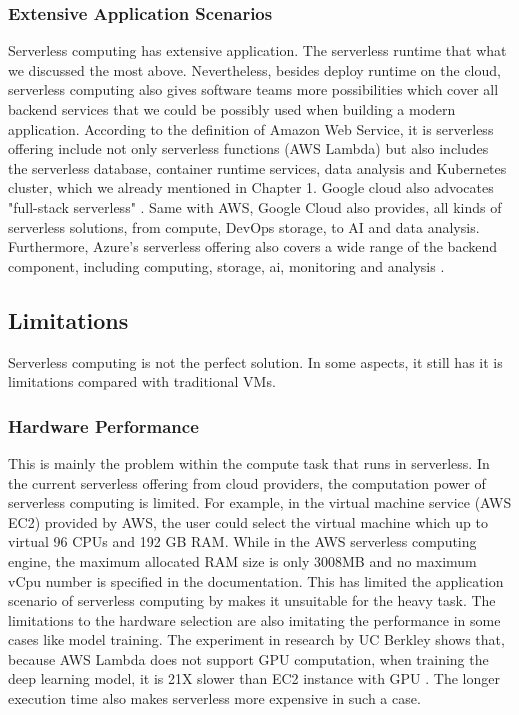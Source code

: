 \subsubsection{Extensive Application Scenarios}
Serverless computing has extensive application. The serverless runtime that what we discussed the most above. Nevertheless, besides deploy runtime on the cloud, serverless computing also gives software teams more possibilities which cover all backend services that we could be possibly used when building a modern application. According to the definition of Amazon Web Service, it is serverless offering include not only serverless functions (AWS Lambda) but also includes the serverless database, container runtime services, data analysis and Kubernetes cluster, which we already mentioned in Chapter 1. Google cloud also advocates "full-stack serverless" \cite{Serverle29:online}. Same with AWS, Google Cloud also provides, all kinds of serverless solutions, from compute, DevOps storage, to AI and data analysis. Furthermore, Azure's serverless offering also covers a wide range of the backend component, including computing, storage, ai, monitoring and analysis \cite{AzureSer56:online}.
\subsection{Limitations}
\label{servlesslimitation}
Serverless computing is not the perfect solution. In some aspects, it still has it is limitations compared with traditional VMs.
\subsubsection{Hardware Performance}
This is mainly the problem within the compute task that runs in serverless. In the current serverless offering from cloud providers, the computation power of serverless computing is limited. For example, in the virtual machine service (AWS EC2) provided by AWS, the user could select the virtual machine which up to virtual 96 CPUs and 192 GB RAM. While in the AWS serverless computing engine, the maximum allocated RAM size is only 3008MB \cite{AWSLambd13:online} and no maximum vCpu number is specified in the documentation. This has limited the application scenario of serverless computing by makes it unsuitable for the heavy task. The limitations to the hardware selection are also imitating the performance in some cases like model training. The experiment in research by UC Berkley shows that, because AWS Lambda does not support GPU computation, when training the deep learning model, it is 21X slower than EC2 instance with GPU \cite{hellerstein2018serverless}. The longer execution time also makes serverless more expensive in such a case. 
